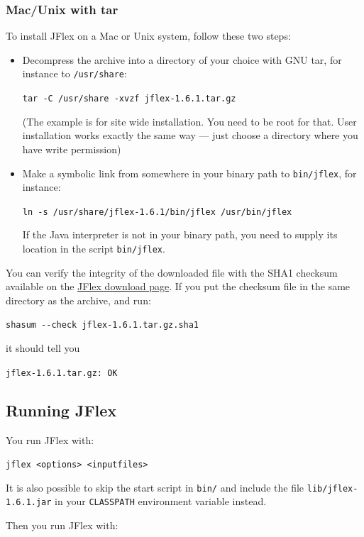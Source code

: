 \subsubsection{Mac/Unix with tar}\label{macunix-with-tar}

To install JFlex on a Mac or Unix system, follow these two steps:

\begin{itemize}
\item
  Decompress the archive into a directory of your choice with GNU tar,
  for instance to \texttt{/usr/share}:

  \texttt{tar\ -C\ /usr/share\ -xvzf\ jflex-1.6.1.tar.gz}

  (The example is for site wide installation. You need to be root for
  that. User installation works exactly the same way --- just choose a
  directory where you have write permission)
\item
  Make a symbolic link from somewhere in your binary path to
  \texttt{bin/jflex}, for instance:

  \texttt{ln\ -s\ /usr/share/jflex-1.6.1/bin/jflex\ /usr/bin/jflex}

  If the Java interpreter is not in your binary path, you need to supply
  its location in the script \texttt{bin/jflex}.
\end{itemize}

You can verify the integrity of the downloaded file with the SHA1
checksum available on the \href{http://jflex.de/download.html}{JFlex
download page}. If you put the checksum file in the same directory as
the archive, and run:

\texttt{shasum\ -\/-check\ jflex-1.6.1.tar.gz.sha1}

it should tell you

\texttt{jflex-1.6.1.tar.gz:\ OK}

\subsection{Running JFlex}\label{running-jflex}

You run JFlex with:

\texttt{jflex\ \textless{}options\textgreater{}\ \textless{}inputfiles\textgreater{}}

It is also possible to skip the start script in \texttt{bin/} and
include the file \texttt{lib/jflex-1.6.1.jar} in your \texttt{CLASSPATH}
environment variable instead.

Then you run JFlex with:

